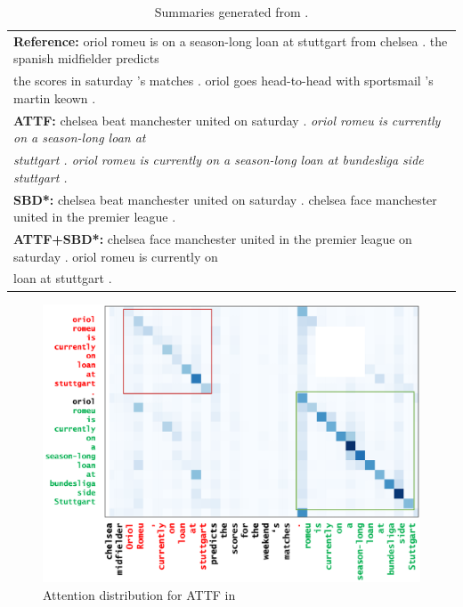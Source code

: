 \begin{table}[th!]
\begin{center}
\caption{Summaries generated from .}
\begin{tabular}{l}
\toprule[1pt] \textbf{Reference:} oriol romeu is on a season-long loan at stuttgart from chelsea . 
       the spanish midfielder predicts \\ the scores in saturday 's matches . oriol goes
	   head-to-head with sportsmail 's martin keown .\\
\hline \textbf{ATTF:} chelsea beat manchester united on saturday . \textit{oriol romeu is currently on a season-long loan at} \\
\textit{stuttgart .  oriol romeu is currently on a season-long loan at bundesliga side stuttgart .}\\
\hline \textbf{SBD*:} chelsea beat manchester united on saturday . chelsea face manchester 
       united in the premier league . \\ 
\hline \textbf{ATTF+SBD*:} chelsea face manchester united in the premier league on saturday . 
       oriol romeu is currently on \\ loan at stuttgart . \\
\bottomrule[1pt]
\end{tabular}
\label{tab:src_rep}
\end{center}
\end{table}

\begin{figure}[th!]
	\centering
	\includegraphics[width=0.78\columnwidth]{map3}
	\caption{Attention distribution for ATTF in }
	\label{fig:attn_map3}
\end{figure}

